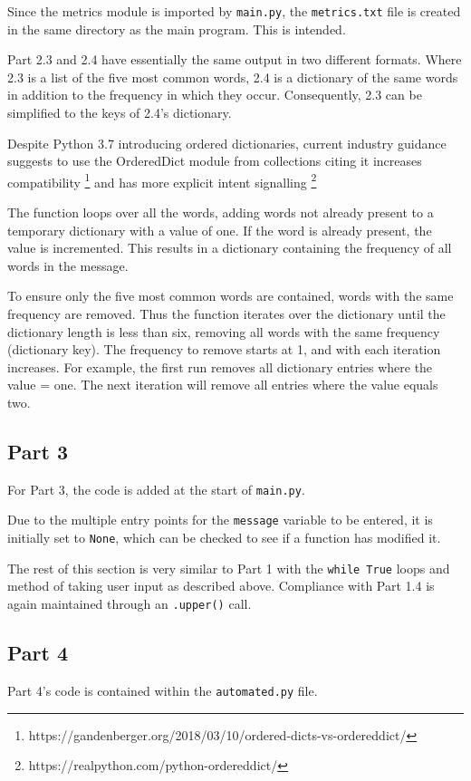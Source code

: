 \documentclass{article}
\begin{document}
Since the metrics module is imported by \texttt{main.py}, the \texttt{metrics.txt} file is created in the same directory as the main program. This is intended.

Part 2.3 and 2.4 have essentially the same output in two different formats. Where 2.3 is a list of the five most common words, 2.4 is a dictionary of the same words in addition to the frequency in which they occur. Consequently, 2.3 can be simplified to the keys of 2.4's dictionary.

Despite Python 3.7 introducing ordered dictionaries, current industry guidance suggests to use the OrderedDict module from collections citing it increases compatibility \footnote{https://gandenberger.org/2018/03/10/ordered-dicts-vs-ordereddict/} and has more explicit intent signalling \footnote{https://realpython.com/python-ordereddict/}

The function loops over all the words, adding words not already present to a temporary dictionary with a value of one. If the word is already present, the value is incremented. This results in a dictionary containing the frequency of all words in the message.

To ensure only the five most common words are contained, words with the same frequency are removed. Thus the function iterates over the dictionary until the dictionary length is less than six, removing all words with the same frequency (dictionary key). The frequency to remove starts at 1, and with each iteration increases. For example, the first run removes all dictionary entries where the value = one. The next iteration will remove all entries where the value equals two.

\subsection{Part 3}
For Part 3, the code is added at the start of \texttt{main.py}. 

Due to the multiple entry points for the \texttt{message} variable to be entered, it is initially set to \texttt{None}, which can be checked to see if a function has modified it.

The rest of this section is very similar to Part 1 with the \texttt{while True} loops and method of taking user input as described above. Compliance with Part 1.4 is again maintained through an \texttt{.upper()} call.

\subsection{Part 4}
Part 4's code is contained within the \texttt{automated.py} file.
\end{document}
